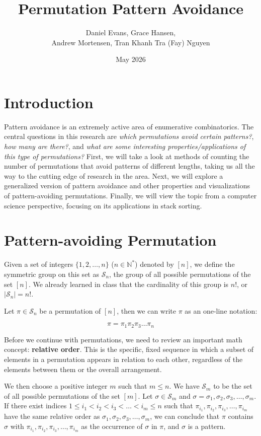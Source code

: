 \documentclass[12pt]{article}
\title{Permutation Pattern Avoidance}
\author{Daniel Evans, Grace Hansen, \\Andrew Mortensen, Tran Khanh Tra (Fay) Nguyen}
\date{May 2026}
\begin{document}
\maketitle
\section{Introduction}
Pattern avoidance is an extremely active area of enumerative combinatorics. The central questions in this research are \textit{which permutations avoid certain patterns?}, \textit{how many are there?}, and \textit{what are some interesting properties/applications of this type of permutations?} First, we will take a look at methods of counting the number of permutations that avoid patterns of different lengths, taking us all the way to the cutting edge of research in the area. Next, we will explore a generalized version of pattern avoidance and other properties and visualizations of pattern-avoiding permutations. Finally, we will view the topic from a computer science perspective, focusing on its applications in stack sorting.




\section{Pattern-avoiding Permutation}

Given a set of integers $\{1,2,\ldots,n\}$ ($n \in \mathbb{N}^*$) denoted by $[n]$, we define the symmetric group on this set as $\mathcal{S}_n$, the group of all possible permutations of the set $[n]$. We already learned in class that the cardinality of this group is $n!$, or $|\mathcal{S}_n| = n!$.

Let $\pi \in \mathcal{S}_n$ be a permutation of $[n]$, then we can write $\pi$ as an one-line notation:

$$\pi = \pi_1\pi_2\pi_3\ldots\pi_n$$

Before we continue with permutations, we need to review an important math concept: \textbf{relative order}. This is the specific, fixed sequence in which a subset of elements in a permutation appears in relation to each other, regardless of the elements between them or the overall arrangement.


We then choose a positive integer $m$ such that $m \leq n$. We have $\mathcal{S}_m$ to be the set of all possible permutations of the set $[m]$. Let $\sigma \in \mathcal{S}_m$ and $\sigma =\sigma_1, \sigma_2, \sigma_3, \ldots, \sigma_m$. If there exist indices $1\leq i_1 < i_2 < i_3 < \ldots < i_m\leq n$ such that $\pi_{i_1}, \pi_{i_2}, \pi_{i_3}, \ldots, \pi_{i_m}$ have the same relative order as $\sigma_1, \sigma_2, \sigma_3, \ldots, \sigma_m$, we can conclude that $\pi$ contains $\sigma$ with $\pi_{i_1}, \pi_{i_2}, \pi_{i_3}, \ldots, \pi_{i_m}$ as the occurrence  of $\sigma$ in $\pi$, and $\sigma$ is a pattern.
\end{document}
